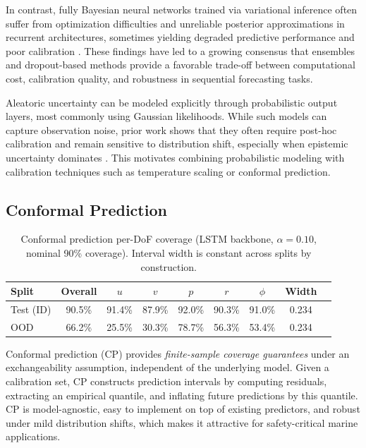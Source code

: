 \documentclass[a4paper,fleqn]{cas-sc}
\begin{document}
In contrast, fully Bayesian neural networks trained via variational inference often suffer from optimization difficulties and unreliable posterior approximations in recurrent architectures, sometimes yielding degraded predictive performance and poor calibration \cite{foldesi2023comparison}. These findings have led to a growing consensus that ensembles and dropout-based methods provide a favorable trade-off between computational cost, calibration quality, and robustness in sequential forecasting tasks.

Aleatoric uncertainty can be modeled explicitly through probabilistic output layers, most commonly using Gaussian likelihoods. While such models can capture observation noise, prior work shows that they often require post-hoc calibration and remain sensitive to distribution shift, especially when epistemic uncertainty dominates \cite{foldesi2023comparison}. This motivates combining probabilistic modeling with calibration techniques such as temperature scaling or conformal prediction.


\subsection{Conformal Prediction}
\begin{table}[t]
    \centering
    \caption{Conformal prediction per-DoF coverage (LSTM backbone, 
    $\alpha=0.10$, nominal 90\% coverage). Interval width is 
    constant across splits by construction.}
    \label{tab:conformal}
    \begin{tabular}{lcccccccc}
        \toprule
        \textbf{Split} & \textbf{Overall} & $u$ & $v$ & $p$ & $r$ & $\phi$ & \textbf{Width} \\
        \midrule
        Test (ID) & 90.5\% & 91.4\% & 87.9\% & 92.0\% & 90.3\% & 91.0\% & 0.234 \\
        OOD       & 66.2\% & 25.5\% & 30.3\% & 78.7\% & 56.3\% & 53.4\% & 0.234 \\
        \bottomrule
    \end{tabular}
\end{table}
Conformal prediction (CP) provides \emph{finite-sample coverage guarantees} under an exchangeability assumption, independent of the underlying model. Given a calibration set, CP constructs prediction intervals by computing residuals, extracting an empirical quantile, and inflating future predictions by this quantile. CP is model-agnostic, easy to implement on top of existing predictors, and robust under mild distribution shifts, which makes it attractive for safety-critical marine applications.
\end{document}
